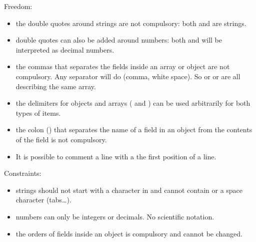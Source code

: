 \documentclass[letterpaper,10pt,openany,oneside,english]{sphinxmanual}
\begin{document}
\sphinxAtStartPar
Freedom:
\begin{itemize}
\item {} 
\sphinxAtStartPar
the double quotes around strings are not compulsory: both  and  are strings.

\item {} 
\sphinxAtStartPar
double quotes can also be added around numbers: both  and  will be interpreted as decimal numbers.

\item {} 
\sphinxAtStartPar
the commas that separates the fields inside an array or object are not compulsory. Any separator will do (comma, white space). So \sphinxcode{\sphinxupquote{{[}1, 2{]}}} or \sphinxcode{\sphinxupquote{{[}1,2{]}}} or \sphinxcode{\sphinxupquote{{[}1 2{]}}} are all describing the same array.

\item {} 
\sphinxAtStartPar
the delimiters for objects and arrays (\sphinxcode{\sphinxupquote{\{\}}} and \sphinxcode{\sphinxupquote{{[}{]}}}) can be used arbitrarily for both types of items.

\item {} 
\sphinxAtStartPar
the colon (\sphinxcode{\sphinxupquote{:}}) that separates the name of a field in an object from the contents of the field is not compulsory.

\item {} 
\sphinxAtStartPar
It is possible to comment a line with a \sphinxcode{\sphinxupquote{\#}} the first position of a line.

\end{itemize}

\sphinxAtStartPar
Constraints:
\begin{itemize}
\item {} 
\sphinxAtStartPar
strings should not start with a character in  and cannot contain \sphinxcode{\sphinxupquote{/\#{[}{]}\{\}}} or a space character (tabs…).

\item {} 
\sphinxAtStartPar
numbers can only be integers or decimals. No scientific notation.

\item {} 
\sphinxAtStartPar
the orders of fields inside an object is compulsory and cannot be changed.

\end{itemize}
\end{document}
